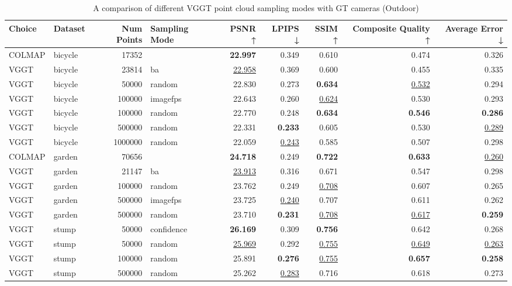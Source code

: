 \begin{table}[H]
\caption{\ifdefined\customcaption \customcaption \else A comparison of different VGGT point cloud sampling modes with GT cameras (Outdoor) \fi}
\label{tab:03_sampling_mode_gt_cams_outdoor}
\centering
\scriptsize
\begin{tabular}{llrlrrrrr}
\toprule
Choice & Dataset & Num Points & Sampling Mode & PSNR ↑ & LPIPS ↓ & SSIM ↑ & Composite Quality ↑ & Average Error ↓ \\
\midrule
COLMAP & bicycle & 17352 &  & \textbf{22.997} & 0.349 & 0.610 & 0.474 & 0.326 \\
VGGT & bicycle & 23814 & ba & \underline{22.958} & 0.369 & 0.600 & 0.455 & 0.335 \\
VGGT & bicycle & 50000 & random & 22.830 & 0.273 & \textbf{0.634} & \underline{0.532} & 0.294 \\
VGGT & bicycle & 100000 & imagefps & 22.643 & 0.260 & \underline{0.624} & 0.530 & 0.293 \\
VGGT & bicycle & 100000 & random & 22.770 & 0.248 & \textbf{0.634} & \textbf{0.546} & \textbf{0.286} \\
VGGT & bicycle & 500000 & random & 22.331 & \textbf{0.233} & 0.605 & 0.530 & \underline{0.289} \\
VGGT & bicycle & 1000000 & random & 22.059 & \underline{0.243} & 0.585 & 0.507 & 0.298 \\
\midrule
COLMAP & garden & 70656 &  & \textbf{24.718} & 0.249 & \textbf{0.722} & \textbf{0.633} & \underline{0.260} \\
VGGT & garden & 21147 & ba & \underline{23.913} & 0.316 & 0.671 & 0.547 & 0.298 \\
VGGT & garden & 100000 & random & 23.762 & 0.249 & \underline{0.708} & 0.607 & 0.265 \\
VGGT & garden & 500000 & imagefps & 23.725 & \underline{0.240} & 0.707 & 0.611 & 0.262 \\
VGGT & garden & 500000 & random & 23.710 & \textbf{0.231} & \underline{0.708} & \underline{0.617} & \textbf{0.259} \\
\midrule
VGGT & stump & 50000 & confidence & \textbf{26.169} & 0.309 & \textbf{0.756} & 0.642 & 0.268 \\
VGGT & stump & 50000 & random & \underline{25.969} & 0.292 & \underline{0.755} & \underline{0.649} & \underline{0.263} \\
VGGT & stump & 100000 & random & 25.891 & \textbf{0.276} & \underline{0.755} & \textbf{0.657} & \textbf{0.258} \\
VGGT & stump & 500000 & random & 25.262 & \underline{0.283} & 0.716 & 0.618 & 0.273 \\
\bottomrule
\end{tabular}
\end{table}